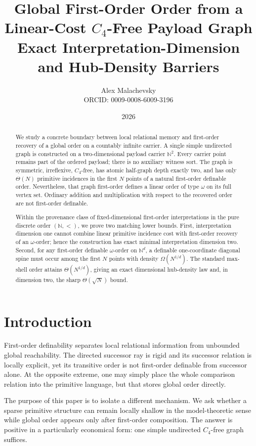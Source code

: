 \documentclass[11pt]{article}
\title{Global First-Order Order from a Linear-Cost $C_4$-Free Payload Graph\\
\large Exact Interpretation-Dimension and Hub-Density Barriers}
\author{Alex Malachevsky\\
\small ORCID: 0009-0008-6009-3196}
\date{2026}
\theoremstyle{definition}
\newcommand{\N}{\mathbb N}
\begin{document}
\maketitle

\begin{abstract}
We study a concrete boundary between local relational memory and first-order recovery of a global order on a countably infinite carrier.  A single simple undirected graph is constructed on a two-dimensional payload carrier $\N^2$.  Every carrier point remains part of the ordered payload; there is no auxiliary witness sort.  The graph is symmetric, irreflexive, $C_4$-free, has atomic half-graph depth exactly two, and has only $\Theta(N)$ primitive incidences in the first $N$ points of a natural first-order definable order.  Nevertheless, that graph first-order defines a linear order of type $\omega$ on its full vertex set.  Ordinary addition and multiplication with respect to the recovered order are not first-order definable.

Within the provenance class of fixed-dimensional first-order interpretations in the pure discrete order $(\N,<)$, we prove two matching lower bounds.  First, interpretation dimension one cannot combine linear primitive incidence cost with first-order recovery of an $\omega$-order; hence the construction has exact minimal interpretation dimension two.  Second, for any first-order definable $\omega$-order on $\N^d$, a definable one-coordinate diagonal spine must occur among the first $N$ points with density $\Omega(N^{1/d})$.  The standard max-shell order attains $\Theta(N^{1/d})$, giving an exact dimensional hub-density law and, in dimension two, the sharp $\Theta(\sqrt N)$ bound.
\end{abstract}

\section{Introduction}

First-order definability separates local relational information from unbounded global reachability.  The directed successor ray is rigid and its successor relation is locally explicit, yet its transitive order is not first-order definable from successor alone.  At the opposite extreme, one may simply place the whole comparison relation into the primitive language, but that stores global order directly.

The purpose of this paper is to isolate a different mechanism.  We ask whether a sparse primitive structure can remain locally shallow in the model-theoretic sense while global order appears only after first-order composition.  The answer is positive in a particularly economical form: one simple undirected $C_4$-free graph suffices.
\end{document}
